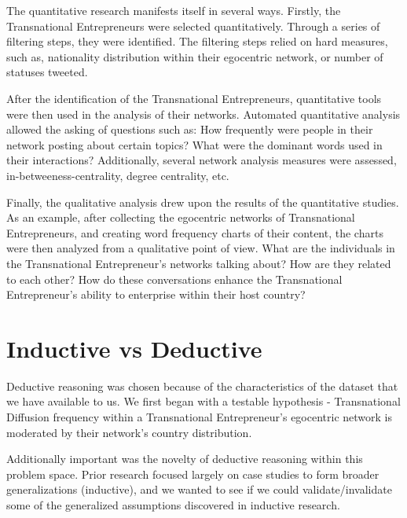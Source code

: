The quantitative research manifests itself in several ways. Firstly,
the Transnational Entrepreneurs were selected quantitatively. Through
a series of filtering steps, they were identified. The filtering steps
relied on hard measures, such as, nationality distribution within
their egocentric network, or number of statuses tweeted.

After the identification of the Transnational Entrepreneurs,
quantitative tools were then used in the analysis of their
networks. Automated quantitative analysis allowed the asking of
questions such as: How frequently were people in their network posting
about certain topics?  What were the dominant words used in their
interactions? Additionally, several network analysis measures were
assessed, in-betweeness-centrality, degree centrality, etc.

Finally, the qualitative analysis drew upon the results of the
quantitative studies. As an example, after collecting the egocentric
networks of Transnational Entrepreneurs, and creating word frequency
charts of their content, the charts were then analyzed from a
qualitative point of view. What are the individuals in the
Transnational Entrepreneur's networks talking about? How are they
related to each other? How do these conversations enhance the
Transnational Entrepreneur's ability to enterprise within their host
country?

\section{Inductive vs Deductive}
Deductive reasoning was chosen because of the characteristics of the
dataset that we have available to us. We first began with a testable
hypothesis - Transnational Diffusion frequency within a Transnational
Entrepreneur's egocentric network is moderated by their network's
country distribution.

Additionally important was the novelty of deductive reasoning within
this problem space. Prior research focused largely on case studies to
form broader generalizations (inductive), and we wanted to see if we
could validate/invalidate some of the generalized assumptions
discovered in inductive research.
